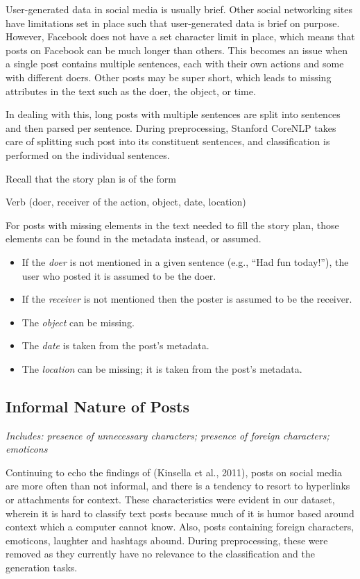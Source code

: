 User-generated data in social media is usually brief. Other social networking sites have limitations set in place such that user-generated data is brief on purpose. However, Facebook does not have a set character limit in place, which means that posts on Facebook can be much longer than others. This becomes an issue when a single post contains multiple sentences, each with their own actions and some with different doers. Other posts may be super short, which leads to missing attributes in the text such as the doer, the object, or time.

In dealing with this, long posts with multiple sentences are split into sentences and then parsed per sentence. During preprocessing, Stanford CoreNLP takes care of splitting such post into its constituent sentences, and classification is performed on the individual sentences.

Recall that the story plan is of the form
\begin{center} Verb (doer, receiver of the action, object, date, location) \end{center}

For posts with missing elements in the text needed to fill the story plan, those elements can be found in the metadata instead, or assumed. 
\begin{itemize}
	\item If the \textit{doer} is not mentioned in a given sentence (e.g., ``Had fun today!”), the user who posted it is assumed to be the doer.
	\item If the \textit{receiver} is not mentioned then the poster is assumed to be the receiver.
	\item The \textit{object} can be missing.
	\item The \textit{date} is taken from the post’s metadata.
	\item The \textit{location} can be missing; it is taken from the post’s metadata.
\end{itemize}

\subsection{Informal Nature of Posts}
\textit{Includes: presence of unnecessary characters; presence of foreign characters; emoticons}

Continuing to echo the findings of (Kinsella et al., 2011), posts on social media are more often than not informal, and there is a tendency to resort to hyperlinks or attachments for context. These characteristics were evident in our dataset, wherein it is hard to classify text posts because much of it is humor based around context which a computer cannot know. Also, posts containing foreign characters, emoticons, laughter and hashtags abound. During preprocessing, these were removed as they currently have no relevance to the classification and the generation tasks.

